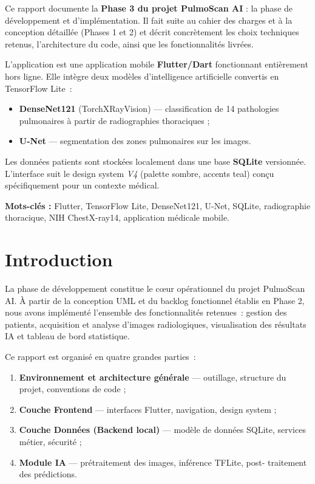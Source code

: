 \documentclass[12pt, a4paper]{report}
\begin{document}
Ce rapport documente la \textbf{Phase 3 du projet PulmoScan AI} : la phase de
développement et d'implémentation. Il fait suite au cahier des charges et à la
conception détaillée (Phases 1 et 2) et décrit concrètement les choix techniques
retenus, l'architecture du code, ainsi que les fonctionnalités livrées.

L'application est une application mobile \textbf{Flutter/Dart} fonctionnant
entièrement hors ligne. Elle intègre deux modèles d'intelligence artificielle
convertis en TensorFlow Lite~:
\begin{itemize}
  \item \textbf{DenseNet121} (TorchXRayVision) — classification de 14 pathologies
        pulmonaires à partir de radiographies thoraciques ;
  \item \textbf{U-Net} — segmentation des zones pulmonaires sur les images.
\end{itemize}

Les données patients sont stockées localement dans une base \textbf{SQLite}
versionnée. L'interface suit le design system \textit{V4} (palette sombre, accents
teal) conçu spécifiquement pour un contexte médical.

\vspace{0.5em}
\noindent\textbf{Mots-clés :} Flutter, TensorFlow Lite, DenseNet121, U-Net,
SQLite, radiographie thoracique, NIH ChestX-ray14, application médicale mobile.

\tableofcontents
\listoffigures
\listoftables
\clearpage

\chapter*{Introduction}

La phase de développement constitue le cœur opérationnel du projet PulmoScan AI.
À partir de la conception UML et du backlog fonctionnel établis en Phase 2, nous
avons implémenté l'ensemble des fonctionnalités retenues~: gestion des patients,
acquisition et analyse d'images radiologiques, visualisation des résultats IA et
tableau de bord statistique.

Ce rapport est organisé en quatre grandes parties~:
\begin{enumerate}
  \item \textbf{Environnement et architecture générale} — outillage, structure du
        projet, conventions de code ;
  \item \textbf{Couche Frontend} — interfaces Flutter, navigation, design system ;
  \item \textbf{Couche Données (Backend local)} — modèle de données SQLite,
        services métier, sécurité ;
  \item \textbf{Module IA} — prétraitement des images, inférence TFLite, post-
        traitement des prédictions.
\end{enumerate}
\end{document}
